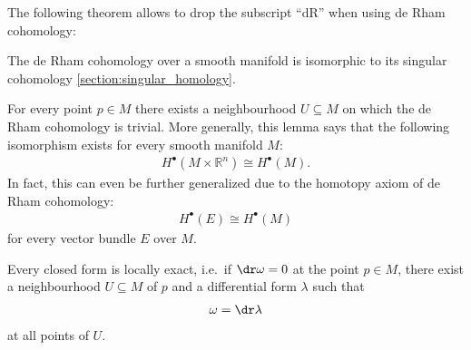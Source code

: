     The following theorem allows to drop the subscript ``$\text{dR}$'' when using de Rham cohomology:
    \begin{theorem}[de Rham]
        The de Rham cohomology over a smooth manifold is isomorphic to its singular cohomology \ref{section:singular_homology}.
    \end{theorem}

    \begin{theorem}\label{bundle:poincare}
        For every point $p\in M$ there exists a neighbourhood $U\subseteq M$ on which the de Rham cohomology is trivial. More generally, this lemma says that the following isomorphism exists for every smooth manifold $M$:
        \begin{gather}
            H^\bullet(M\times\mathbb{R}^n)\cong H^\bullet(M).
        \end{gather}
        In fact, this can even be further generalized due to the homotopy axiom of de Rham cohomology:
        \begin{gather}
            H^\bullet(E)\cong H^\bullet(M)
        \end{gather}
        for every vector bundle $E$ over $M$.
    \end{theorem}
    \begin{result}
        Every closed form is locally exact, i.e.~if $\dr\omega=0$ at the point $p\in M$, there exist a neighbourhood $U\subseteq M$ of $p$ and a differential form $\lambda$ such that
        \begin{gather}
            \omega=\dr\lambda
        \end{gather}
        at all points of $U$.
    \end{result}


